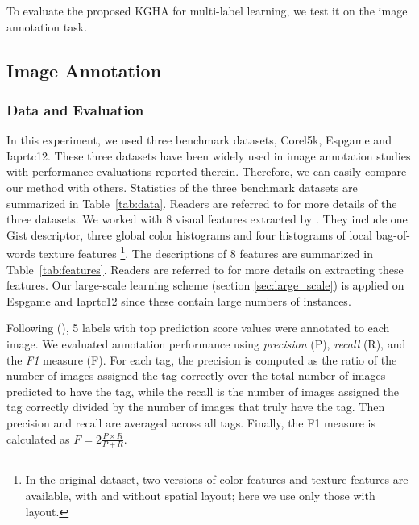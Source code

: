 \documentclass[a4paper]{article}
\begin{document}
To evaluate the proposed KGHA for multi-label learning, we test it on the image annotation task.  
\subsection{Image Annotation}
\subsubsection{Data and Evaluation}
In this experiment, we used three benchmark datasets, \textsf{Corel5k}, \textsf{Espgame} and \textsf{Iaprtc12}. 
These three datasets have been widely used in image annotation studies \cite{GMVS09,baseline,chen_2013_icml} with 
performance evaluations reported therein.  Therefore, we can easily compare our method with others.   
Statistics of the three benchmark datasets are summarized in Table~\ref{tab:data}.
Readers are referred to \citet{baseline} for more details of the three datasets.  
We worked with 8 visual features extracted by \citet{GMVS09}.
They include one Gist descriptor, three global color histograms and four histograms of local bag-of-words texture features%
\footnote{In the original dataset, two versions of color features 
and texture features are available, with and without spatial layout; here we use only those with layout.}. The descriptions of 8 features are 
summarized in Table~\ref{tab:features}. Readers are referred to \citet{GMVS09} for more details on extracting these features.
Our large-scale learning scheme (section \ref{sec:large_scale}) is applied on \textsf{Espgame} and \textsf{Iaprtc12} since these contain large numbers of instances.    

Following \citeauthor{chen_2013_icml} (\citeyear{chen_2013_icml}), 5 labels with top prediction 
score values were annotated to each image. We evaluated annotation performance using \emph{precision} (P), \emph{recall} (R), and the \emph{F1} measure (F). For each tag, the precision is 
computed as the ratio of the number of images assigned the tag correctly over the total number of images predicted to have the tag, while the recall is the number of images 
assigned the tag correctly divided by the number of images that truly have the tag. Then precision and recall are averaged across all tags. Finally, the F1 measure is calculated as 
$F=2\frac{P\times R}{P+R}$.
\end{document}
